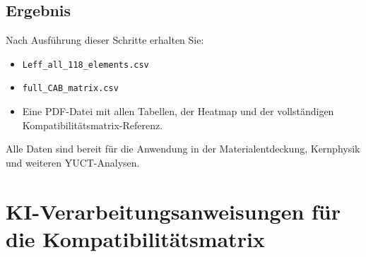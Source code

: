 \documentclass[11pt,a4paper]{article}
\begin{document}
	\subsection*{Ergebnis}
	Nach Ausführung dieser Schritte erhalten Sie:
	\begin{itemize}
		\item \texttt{Leff\_all\_118\_elements.csv}
		\item \texttt{full\_CAB\_matrix.csv}
		\item Eine PDF-Datei mit allen Tabellen, der Heatmap und der vollständigen Kompatibilitätsmatrix-Referenz.
	\end{itemize}
	Alle Daten sind bereit für die Anwendung in der Materialentdeckung, Kernphysik und weiteren YUCT-Analysen.
	
	\section*{KI-Verarbeitungsanweisungen für die Kompatibilitätsmatrix}
	\label{sec:ai_instructions}
	
\end{document}
